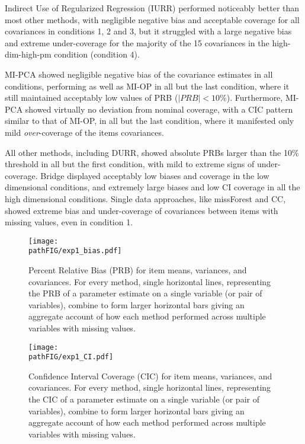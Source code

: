 \documentclass[]{./cls/interact}
\theoremstyle{plain}
\theoremstyle{definition}
\theoremstyle{remark}
\newcommand{\pathFIG}{./figures}
\begin{document}
	Indirect Use of Regularized Regression (IURR) performed noticeably better than most other methods, 
	with negligible negative bias and acceptable coverage for all covariances in conditions 1, 2 and 3, 
	but it struggled with a large negative bias and extreme under-coverage for the majority of the 15 
	covariances in the high-dim-high-pm condition (condition 4).
	
	MI-PCA showed negligible negative bias of the covariance estimates in all conditions, performing as 
	well as MI-OP in all but the last condition, where it still maintained acceptably low values of PRB 
	($|PRB| < 10\%$).
	Furthermore, MI-PCA showed virtually no deviation from nominal coverage, with a CIC pattern similar to 
	that of MI-OP, in all but the last condition, where it manifested only mild \emph{over}-coverage of the 
	items covariances.

	All other methods, including DURR, showed absolute PRBs larger than the 10\% threshold in all but the 
	first condition, with mild to extreme signs of under-coverage.
	Bridge displayed acceptably low biases and coverage in the low dimensional conditions, and 
	extremely large biases and low CI coverage in all the high dimensional conditions.
	Single data approaches, like missForest and CC, showed extreme bias and under-coverage of covariances between 
	items with missing values, even in condition 1.

\begin{figure}
\centering
\texttt{[image: \\pathFIG/exp1\_bias.pdf]}
\caption{\label{fig:exp1bias}
	Percent Relative Bias (PRB) for item means, variances, and covariances.
	For every method, single horizontal lines, representing the PRB of a parameter estimate on 
	a single variable (or pair of variables), combine to form larger horizontal bars giving an 
	aggregate account of how each method performed across multiple variables with missing values.
	}
\end{figure}

\begin{figure}
\centering
\texttt{[image: \\pathFIG/exp1\_CI.pdf]}
\caption{\label{fig:exp1cir}
	Confidence Interval Coverage (CIC) for item means, variances, and covariances. 
	For every method, single horizontal lines, representing the CIC of a parameter estimate on 
	a single variable (or pair of variables), combine to form larger horizontal bars giving an 
	aggregate account of how each method performed across multiple variables with missing values.
	}
\end{figure}
\end{document}
